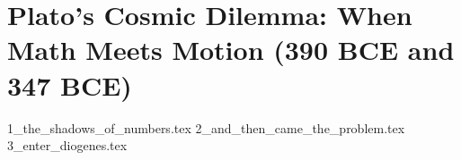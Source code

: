 \section{Plato’s Cosmic Dilemma: When Math Meets Motion (390 BCE and 347 BCE)}  

{1_the_shadows_of_numbers.tex}
{2_and_then_came_the_problem.tex}
{3_enter_diogenes.tex}
